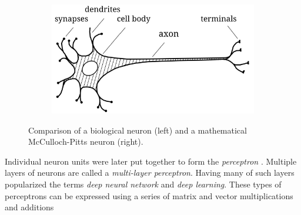 \begin{figure}[b]
    \centering
    \begin{subfigure}{0.49\textwidth}
        \raggedright
        \includegraphics[width=\textwidth]{assets/bio_neuron.pdf}
    \end{subfigure}
    \begin{subfigure}{0.5\textwidth}
        \raggedleft
    \end{subfigure}
    \caption{Comparison of a biological neuron \cite{bio-neuron} (left) and a mathematical McCulloch-Pitts neuron (right).}
    \label{fig:neuron}
\end{figure}
Individual neuron units were later put together to form the \textit{perceptron} \cite{first-perceptron}. Multiple layers of neurons are called a \textit{multi-layer perceptron}. Having many of such layers popularized the terms \textit{deep neural network} and \textit{deep learning}. These types of perceptrons can be expressed using a series of matrix and vector multiplications and additions
